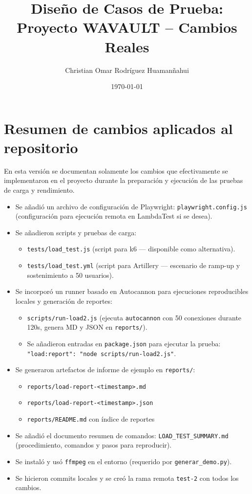 \documentclass[12pt, a4paper]{article}
\title{Diseño de Casos de Prueba: Proyecto WAVAULT -- Cambios Reales}
\author{Christian Omar Rodríguez Huamanñahui}
\date{\today}
\begin{document}
\maketitle
\thispagestyle{empty}
\newpage
\tableofcontents
\thispagestyle{empty}
\newpage
\pagestyle{fancy}

\section{Resumen de cambios aplicados al repositorio}

En esta versión se documentan solamente los cambios que efectivamente se implementaron en el proyecto durante la preparación y ejecución de las pruebas de carga y rendimiento.

\begin{itemize}
  \item Se añadió un archivo de configuración de Playwright: \texttt{playwright.config.js} (configuración para ejecución remota en LambdaTest si se desea).
  \item Se añadieron scripts y pruebas de carga:
    \begin{itemize}
      \item \texttt{tests/load_test.js} (script para k6 — disponible como alternativa).
      \item \texttt{tests/load_test.yml} (script para Artillery — escenario de ramp-up y sostenimiento a 50 usuarios).
    \end{itemize}
  \item Se incorporó un runner basado en Autocannon para ejecuciones reproducibles locales y generación de reportes:
    \begin{itemize}
      \item \texttt{scripts/run-load2.js} (ejecuta \texttt{autocannon} con 50 conexiones durante 120s, genera MD y JSON en \texttt{reports/}).
      \item Se añadieron entradas en \texttt{package.json} para ejecutar la prueba: \texttt{"load:report": "node scripts/run-load2.js"}.
    \end{itemize}
  \item Se generaron artefactos de informe de ejemplo en \texttt{reports/}:
    \begin{itemize}
      \item \texttt{reports/load-report-<timestamp>.md}
      \item \texttt{reports/load-report-<timestamp>.json}
      \item \texttt{reports/README.md} con índice de reportes
    \end{itemize}
  \item Se añadió el documento resumen de comandos: \texttt{LOAD_TEST_SUMMARY.md} (procedimiento, comandos y pasos para reproducir).
  \item Se instaló y usó \texttt{ffmpeg} en el entorno (requerido por \texttt{generar_demo.py}).
  \item Se hicieron commits locales y se creó la rama remota \texttt{test-2} con todos los cambios.
\end{itemize}
\end{document}
